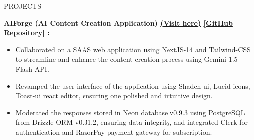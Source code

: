 \documentclass{resume} %
\begin{document}
\begin{rSection}{PROJECTS}
    \item \textbf{AIForge (AI Content Creation Application)
    {\href{https://ai-forge-plum.vercel.app/}{(Visit here)}}
    {\href{https://github.com/arkapg211002/AIForge}{[GitHub Repository]}} :} 
    \vspace{-0.6em}
    \begin{itemize}
    \setlength\itemsep{-0.6em}
     \item Collaborated on a SAAS web application using NextJS-14 and Tailwind-CSS to streamline and enhance the content creation process using Gemini 1.5 Flash API.
    \item  Revamped the user interface of the application using Shadcn-ui, Lucid-icons, Toast-ui react editor, ensuring one polished and intuitive design.
    \item Moderated the responses stored in Neon database v0.9.3 using PostgreSQL from Drizzle ORM v0.31.2, ensuring data integrity, and integrated Clerk for authentication and RazorPay payment gateway for subscription.
    \end{itemize}
    

  
\end{rSection}
\end{document}

